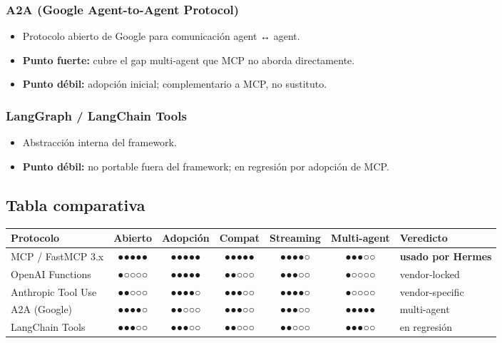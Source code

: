 \documentclass[11pt,a4paper]{article}
\newcommand{\scale}[1]{\textbf{\color{sotagreen}#1}}
\begin{document}
\subsubsection{A2A (Google Agent-to-Agent Protocol)}
\begin{itemize}[leftmargin=*,itemsep=0pt]
\item Protocolo abierto de Google para comunicación agent ↔ agent.
\item \textbf{Punto fuerte:} cubre el gap multi-agent que MCP no aborda directamente.
\item \textbf{Punto débil:} adopción inicial; complementario a MCP, no sustituto.
\end{itemize}

\subsubsection{LangGraph / LangChain Tools}
\begin{itemize}[leftmargin=*,itemsep=0pt]
\item Abstracción interna del framework.
\item \textbf{Punto débil:} no portable fuera del framework; en regresión por adopción de MCP.
\end{itemize}

\subsection{Tabla comparativa}

\begin{center}
\begin{tabularx}{0.95\textwidth}{|l|c|c|c|c|c|X|}
\hline
\rowcolor{sotared}\color{white}\textbf{Protocolo} & \color{white}\textbf{Abierto} & \color{white}\textbf{Adopción} & \color{white}\textbf{Compat} & \color{white}\textbf{Streaming} & \color{white}\textbf{Multi-agent} & \color{white}\textbf{Veredicto}\\
\hline
\rowcolor{hermespos}MCP / FastMCP 3.x & \scale{●●●●●} & \scale{●●●●●} & \scale{●●●●●} & ●●●●○ & ●●●○○ & \textbf{usado por Hermes}\\
OpenAI Functions & ●○○○○ & \scale{●●●●●} & ●●○○○ & ●●●○○ & ●○○○○ & vendor-locked\\
Anthropic Tool Use & ●●○○○ & ●●●●○ & ●●●○○ & ●●●●○ & ●○○○○ & vendor-specific\\
A2A (Google) & ●●●●○ & ●●○○○ & ●●●○○ & ●●●○○ & \scale{●●●●●} & multi-agent\\
LangChain Tools & ●●●○○ & ●●●○○ & ●●○○○ & ●●○○○ & ●●●○○ & en regresión\\
\hline
\end{tabularx}
\end{center}
\end{document}
